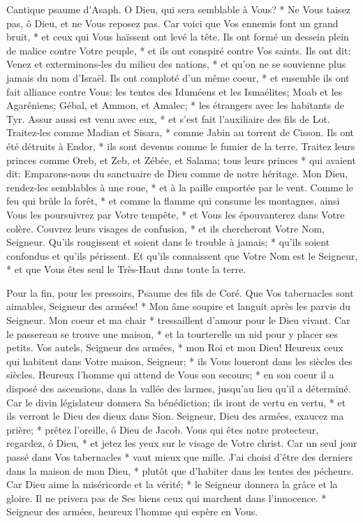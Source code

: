 Cantique psaume d'Asaph.
O Dieu, qui sera semblable à Vous? * Ne Vous taisez pas, ô Dieu, et ne Vous reposez pas.
Car voici que Vos ennemis font un grand bruit, * et ceux qui Vous haïssent ont levé la tête.
Ils ont formé un dessein plein de malice contre Votre peuple, * et ils ont conspiré contre Vos saints.
Ils ont dit: Venez et exterminons-les du milieu des nations, * et qu'on ne se souvienne plus jamais du nom d'Israël.
Ils ont comploté d'un même coeur, * et ensemble ils ont fait alliance contre Vous:
les tentes des Iduméens et les Ismaélites; Moab et les Agaréniens;
Gébal, et Ammon, et Amalec; * les étrangers avec les habitants de Tyr.
Assur aussi est venu avec eux, * et s'est fait l'auxiliaire des fils de Lot.
Traitez-les comme Madian et Sisara, * comme Jabin au torrent de Cisson.
Ils ont été détruits à Endor, * ils sont devenus comme le fumier de la terre.
Traitez leurs princes comme Oreb, et Zeb, et Zébée, et Salama; tous leurs princes *
qui avaient dit: Emparons-nous du sanctuaire de Dieu comme de notre héritage.
Mon Dieu, rendez-les semblables à une roue, * et à la paille emportée par le vent.
Comme le feu qui brûle la forêt, * et comme la flamme qui consume les montagnes,
ainsi Vous les poursuivrez par Votre tempête, * et Vous les épouvanterez dans Votre colère.
Couvrez leurs visages de confusion, * et ils chercheront Votre Nom, Seigneur.
Qu'ils rougissent et soient dans le trouble à jamais; * qu'ils soient confondus et qu'ils périssent.
Et qu'ils connaissent que Votre Nom est le Seigneur, * et que Vous êtes seul le Très-Haut dans toute la terre.

Pour la fin, pour les pressoirs, Psaume des fils de Coré.
Que Vos tabernacles sont aimables, Seigneur des armées! *
Mon âme soupire et languit après les parvis du Seigneur. Mon coeur et ma chair * tressaillent d'amour pour le Dieu vivant.
Car le passereau se trouve une maison, * et la tourterelle un nid pour y placer ses petits. Vos autels, Seigneur des armées, * mon Roi et mon Dieu!
Heureux ceux qui habitent dans Votre maison, Seigneur; * ils Vous loueront dans les siècles des siècles.
Heureux l'homme qui attend de Vous son secours; * en son coeur il a disposé des ascensions,
dans la vallée des larmes, jusqu'au lieu qu'il a déterminé.
Car le divin législateur donnera Sa bénédiction; ils iront de vertu en vertu, * et ils verront le Dieu des dieux dans Sion.
Seigneur, Dieu des armées, exaucez ma prière; * prêtez l'oreille, ô Dieu de Jacob.
Vous qui êtes notre protecteur, regardez, ô Dieu, * et jetez les yeux sur le visage de Votre christ.
Car un seul jour passé dans Vos tabernacles * vaut mieux que mille. J'ai choisi d'être des derniers dans la maison de mon Dieu, * plutôt que d'habiter dans les tentes des pécheurs.
Car Dieu aime la miséricorde et la vérité; * le Seigneur donnera la grâce et la gloire.
Il ne privera pas de Ses biens ceux qui marchent dans l'innocence. * Seigneur des armées, heureux l'homme qui espère en Vous.

